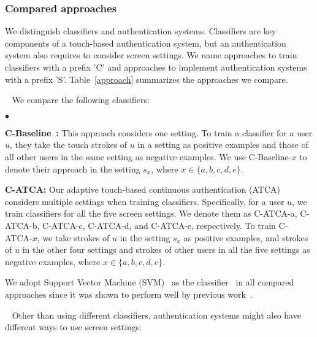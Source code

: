 \documentclass{sig-alternate-05-2015}
\newcommand{\myparatight}[1]{\smallskip\noindent{\bf {#1}:}~}
\newenvironment{packeditemize}{\begin{list}{$\bullet$}{\setlength{\itemsep}{2pt}\addtolength{\labelwidth}{4pt}\setlength{\leftmargin}{20pt}\setlength{\listparindent}{\parindent}\setlength{\parsep}{0pt}\setlength{\topsep}{0pt}}}{\end{list}}
\begin{document}
 



\subsubsection{Compared approaches} 
We distinguish classifiers and authentication systems. Classifiers are key
components of a touch-based authentication system, but an authentication system
also requires to consider screen settings. We name  approaches to train
classifiers with a prefix 'C' and approaches to implement authentication systems
with a prefix 'S'. Table~\ref{approach} summarizes the approaches we compare.

\myparatight{Classifiers} We compare the following classifiers:
\begin{packeditemize}
\item {\bf
C-Baseline~\cite{frank2013touchalytics,li2013unobservable,attack-CCS13}:} This
approach considers one setting.  To train a classifier for a user $u$, they take
the touch strokes of $u$ in a setting as positive examples and those of all other
users in the same setting as negative examples. We use C-Baseline-$x$ to denote 
their approach in the setting $s_x$, where $x\in\{a, b, c,d,e\}$.

\item {\bf C-ATCA:} Our adaptive touch-based continuous authentication (ATCA)
considers multiple settings when training classifiers. Specifically, for a user
$u$, we train  classifiers for all the five screen settings. We denote them as C-ATCA-a, 
C-ATCA-b, C-ATCA-c, C-ATCA-d, and C-ATCA-e, respectively. 
To train C-ATCA-$x$, we take  strokes of
$u$ in the setting $s_x$  as positive examples, and strokes of $u$ in
the other four settings and strokes of other users in all the five settings
as negative examples, where $x\in\{a, b, c,d,e\}$.
\end{packeditemize}

We adopt Support Vector Machine (SVM)~\cite{svm2} as the classifier~\cite{svm2}
in all compared approaches since it was shown to perform well by previous
work~\cite{frank2013touchalytics,li2013unobservable}. 

\myparatight{Authentication systems} Other than using different classifiers,
authentication systems might also have different ways to use screen settings.
\end{document}
